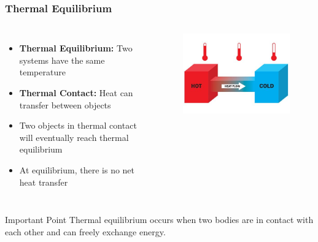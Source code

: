 \documentclass{beamer}
\begin{document}
\begin{frame}
    \frametitle{Thermal Equilibrium}
    \begin{columns}
        \begin{itemize}
            \item \textbf{Thermal Equilibrium:} Two systems have the same temperature
            \item \textbf{Thermal Contact:} Heat can transfer between objects
            \item Two objects in thermal contact will eventually reach thermal equilibrium
            \item At equilibrium, there is no net heat transfer
        \end{itemize}
        
        \begin{center}
            \begin{figure}
                \centering
                \includegraphics[width=0.75\linewidth]{phys11-thermo-thermal-equilibrium.jpg}
            \end{figure}
        \end{center}
    \end{columns}
    
    \begin{block}{Important Point}
        Thermal equilibrium occurs when two bodies are in contact with each other and can freely exchange energy.
    \end{block}
\end{frame}
\end{document}
